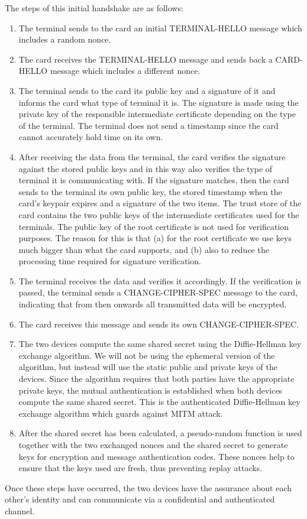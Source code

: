 The steps of this initial handshake are as follows:
\begin{enumerate}
 \item The terminal sends to the card an initial TERMINAL-HELLO message which includes a random nonce.
 \item The card receives the TERMINAL-HELLO message and sends back a CARD-HELLO message which includes a different nonce.
 \item The terminal sends to the card its public key and a signature of it and informs the card what type of terminal it is. The signature is made using the private key of the responsible intermediate certificate depending on the type of the terminal. The terminal does not send a timestamp since the card cannot accurately hold time on its own.
 \item After receiving the data from the terminal, the card verifies the signature against the stored public keys and in this way also verifies the type of terminal it is communicating with. If the signature matches, then the card sends to the terminal its own public key, the stored timestamp when the card's keypair expires and a signature of the two items. The trust store of the card contains the two public keys of the intermediate certificates used for the terminals. The public key of the root certificate is not used for verification purposes. The reason for this is that (a) for the root certificate we use keys much bigger than what the card supports, and (b) also to reduce the processing time required for signature verification.
 \item The terminal receives the data and verifies it accordingly. If the verification is passed, the terminal sends a CHANGE-CIPHER-SPEC message to the card, indicating that from then onwards all transmitted data will be encrypted.
 \item The card receives this message and sends its own CHANGE-CIPHER-SPEC.
 \item The two devices compute the same shared secret using the Diffie-Hellman key exchange algorithm. We will not be using the ephemeral version of the algorithm, but instead will use the static public and private keys of the devices. Since the algorithm requires that both parties have the appropriate private keys, the mutual authentication is established when both devices compute the same shared secret. This is the authenticated Diffie-Hellman key exchange algorithm which guards against MITM attack.
 \item After the shared secret has been calculated, a pseudo-random function is used together with the two exchanged nonces and the shared secret to generate keys for encryption and message authentication codes. These nonces help to ensure that the keys used are fresh, thus preventing replay attacks.
\end{enumerate}

Once these steps have occurred, the two devices have the assurance about each other's identity and can communicate via a confidential and authenticated channel.